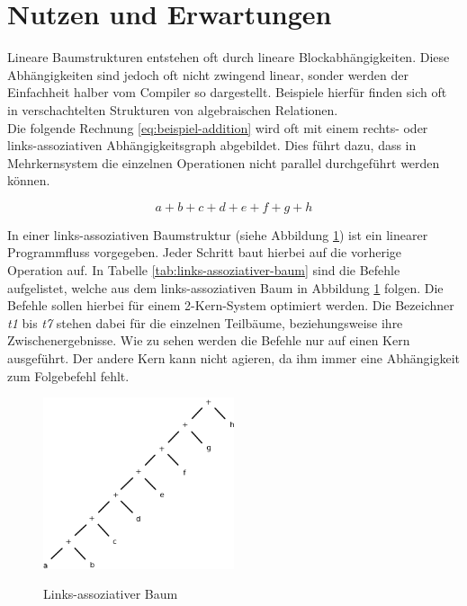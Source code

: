 \section{Nutzen und Erwartungen}
\label{Nutzen}
Lineare Baumstrukturen entstehen oft durch lineare Blockabhängigkeiten. Diese Abhängigkeiten sind jedoch oft nicht zwingend linear, sonder werden der Einfachheit halber vom Compiler so dargestellt. Beispiele hierfür finden sich oft in verschachtelten Strukturen von algebraischen Relationen. \\
Die folgende Rechnung \ref{eq:beispiel-addition} wird oft mit einem rechts- oder links-assoziativen Abhängigkeitsgraph abgebildet. Dies führt dazu, dass in Mehrkernsystem die einzelnen Operationen nicht parallel durchgeführt werden können.

\begin{equation} \label{eq:beispiel-addition}
a + b + c + d + e + f + g + h
\end{equation}

In einer links-assoziativen Baumstruktur (siehe Abbildung \ref{fig:links-assoziativer-baum}\cite{HeBIS-309344573}) ist ein linearer Programmfluss vorgegeben. Jeder Schritt baut hierbei auf die vorherige Operation auf. In Tabelle \ref{tab:links-assoziativer-baum}\cite{HeBIS-309344573} sind die Befehle aufgelistet, welche aus dem links-assoziativen Baum in Abbildung \ref{fig:links-assoziativer-baum} folgen. Die Befehle sollen hierbei für einem 2-Kern-System optimiert werden. Die Bezeichner \textit{t1} bis \textit{t7} stehen dabei für die einzelnen Teilbäume, beziehungsweise ihre Zwischenergebnisse. Wie zu sehen werden die Befehle nur auf einen Kern ausgeführt. Der andere Kern kann nicht agieren, da ihm immer eine Abhängigkeit zum Folgebefehl fehlt.\\

\begin{figure}
	\begin{center}
		\includegraphics[width=0.5\textwidth]{images/links_assoziativer_baum}\\
	\end{center}
	\caption{Links-assoziativer Baum}
	\label{fig:links-assoziativer-baum}
\end{figure}

